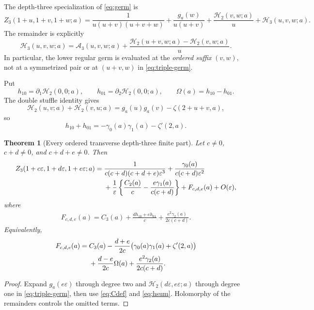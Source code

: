 \documentclass[11pt,a4paper]{article}
\numberwithin{equation}{section}
\newtheorem{theorem}{Theorem}[section]
\theoremstyle{definition}\newtheorem{definition}[theorem]{Definition}
\theoremstyle{remark}\newtheorem{remark}[theorem]{Remark}
\newcommand{\eps}{\varepsilon}
\newcommand{\HH}{\mathcal H}
\newcommand{\Atail}{\mathcal A}
\begin{document}
The depth-three specialization of \eqref{eq:germ} is
\begin{equation}\label{eq:triple-germ}
 \boxed{\displaystyle
 Z_3(1+u,1+v,1+w;a)=
 \frac1{u(u+v)(u+v+w)}+
 \frac{g_a(w)}{u(u+v)}+
 \frac{\HH_2(v,w;a)}u+\HH_3(u,v,w;a).}
\end{equation}
The remainder is explicitly
\begin{equation}\label{eq:H3}
 \HH_3(u,v,w;a)=\Atail_3(u,v,w;a)+
 \frac{\HH_2(u+v,w;a)-\HH_2(v,w;a)}u.
\end{equation}
In particular, the lower regular germ is evaluated at the \emph{ordered
suffix} $(v,w)$, not at a symmetrized pair or at $(u+v,w)$ in
\eqref{eq:triple-germ}.

Put
\begin{equation}\label{eq:h10}
 h_{10}=\partial_1\HH_2(0,0;a),\qquad
 h_{01}=\partial_2\HH_2(0,0;a),\qquad
 \Omega(a)=h_{10}-h_{01}.
\end{equation}
The double stuffle identity gives
\begin{equation}\label{eq:Hsym}
 \HH_2(u,v;a)+\HH_2(v,u;a)
 =g_a(u)g_a(v)-\zeta(2+u+v,a),
\end{equation}
so
\begin{equation}\label{eq:hsum}
 h_{10}+h_{01}=-\gamma_0(a)\gamma_1(a)-\zeta'(2,a).
\end{equation}

\begin{theorem}[Every ordered transverse depth-three finite part]
\label{thm:tripleFP}
Let $c\ne0$, $c+d\ne0$, and $c+d+e\ne0$. Then
\begin{align}\label{eq:tripleLaurent}
 Z_3(1+c\eps,1+d\eps,1+e\eps;a)
 ={}&\frac1{c(c+d)(c+d+e)\eps^3}
 +\frac{\gamma_0(a)}{c(c+d)\eps^2}\notag\\
 &+\frac1\eps\left\{\frac{C_2(a)}c-
          \frac{e\gamma_1(a)}{c(c+d)}\right\}
 +F_{c,d,e}(a)+O(\eps),
\end{align}
where
\begin{align}\label{eq:tripleFP}
 \boxed{\displaystyle F_{c,d,e}(a)
 = C_3(a)+\frac{d h_{10}+e h_{01}}c
              +\frac{e^2\gamma_2(a)}{2c(c+d)}.}
\end{align}
Equivalently,
\begin{align}\label{eq:tripleOmega}
 F_{c,d,e}(a)={}&C_3(a)
 -\frac{d+e}{2c}\bigl(\gamma_0(a)\gamma_1(a)+\zeta'(2,a)\bigr)\notag\\
 &+\frac{d-e}{2c}\Omega(a)
 +\frac{e^2\gamma_2(a)}{2c(c+d)}.
\end{align}
\end{theorem}
\begin{proof}
Expand $g_a(e\eps)$ through degree two and
$\HH_2(d\eps,e\eps;a)$ through degree one in
\eqref{eq:triple-germ}, then use \eqref{eq:Cdef} and
\eqref{eq:hsum}. Holomorphy of the remainders controls the omitted terms.
\end{proof}
\end{document}
